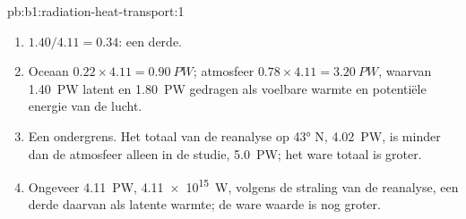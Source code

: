 \begin{solution}{pb:b1:radiation-heat-transport:1}
\begin{enumerate}
        oppervlakte van de kap: \qty{-1.40}{PW}. De atmosfeer brengt \qty{1.40}{PW}
        latente warmte over \ang{40} N.
  \item $1.40/4.11 = 0.34$: een derde.
  \item Oceaan $0.22 \times 4.11 = \qty{0.90}{PW}$; atmosfeer $0.78 \times 4.11 =
        \qty{3.20}{PW}$, waarvan \qty{1.40}{PW} latent en \qty{1.80}{PW}
        gedragen als voelbare warmte en potentiële energie van de lucht.
  \item Een ondergrens. Het totaal van de reanalyse op \ang{43} N, \qty{4.02}{PW}, is minder dan de atmosfeer alleen in de studie, \qty{5.0}{PW}; het ware totaal is groter.
  \item Ongeveer \qty{4.11}{PW}, \qty{4.11e15}{W}, volgens de straling van de reanalyse, een derde daarvan als latente warmte; de ware waarde is nog groter.
\end{enumerate}
\end{solution}
